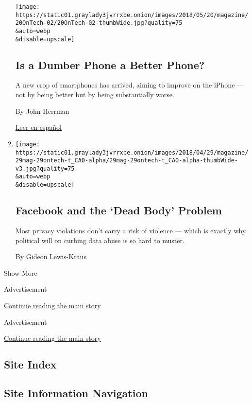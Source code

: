 \begin{enumerate}
  \texttt{[image: https://static01.graylady3jvrrxbe.onion/images/2018/05/20/magazine/20OnTech-02/20OnTech-02-thumbWide.jpg?quality=75\\\&auto=webp\\\&disable=upscale]}

  \hypertarget{is-a-dumber-phone-a-better-phone}{%
  \subsection{Is a Dumber Phone a Better
  Phone?}\label{is-a-dumber-phone-a-better-phone}}

  A new crop of smartphones has arrived, aiming to improve on the iPhone
  --- not by being better but by being substantially worse.

  By John Herrman

  \href{https://www.nytimes3xbfgragh.onion/es/2018/05/28/telefono-inteligente-cambios/}{Leer
  en español}
\item
  \href{/2018/04/24/magazine/facebook-and-the-dead-body-problem.html}{}

  \texttt{[image: https://static01.graylady3jvrrxbe.onion/images/2018/04/29/magazine/29mag-29ontech-t\_CA0-alpha/29mag-29ontech-t\_CA0-alpha-thumbWide-v3.jpg?quality=75\\\&auto=webp\\\&disable=upscale]}

  \hypertarget{facebook-and-the-dead-body-problem}{%
  \subsection{Facebook and the `Dead Body'
  Problem}\label{facebook-and-the-dead-body-problem}}

  Most privacy violations don't carry a risk of violence --- which is
  exactly why political will on curbing data abuse is so hard to muster.

  By Gideon Lewis-Kraus
\end{enumerate}

Show More

Advertisement

\protect\hyperlink{after-mid1}{Continue reading the main story}

Advertisement

\protect\hyperlink{after-mktg}{Continue reading the main story}

\hypertarget{site-index}{%
\subsection{Site Index}\label{site-index}}

\hypertarget{site-information-navigation}{%
\subsection{Site Information
Navigation}\label{site-information-navigation}}


